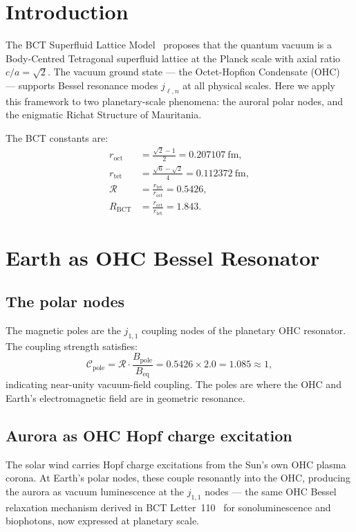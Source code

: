 \documentclass[12pt,twocolumn]{article}
\begin{document}
\section{Introduction}

The BCT Superfluid Lattice Model~\cite{BCT_GoE} proposes that
the quantum vacuum is a Body-Centred Tetragonal superfluid
lattice at the Planck scale with axial ratio $c/a=\sqrt{2}$.
The vacuum ground state --- the Octet-Hopfion Condensate
(OHC)~\cite{BCT_AppJH} --- supports Bessel resonance modes
$j_{\ell,n}$ at all physical scales. Here we apply this
framework to two planetary-scale phenomena: the auroral polar
nodes, and the enigmatic Richat Structure of Mauritania.

The BCT constants are:
\begin{align}
r_\mathrm{oct}&=\frac{\sqrt{2}-1}{2}=0.207107~\mathrm{fm},\\
r_\mathrm{tet}&=\frac{\sqrt{6}-\sqrt{2}}{4}=0.112372~\mathrm{fm},\\
\mathcal{R}&=\frac{r_\mathrm{tet}}{r_\mathrm{oct}}=0.5426,\\
R_\mathrm{BCT}&=\frac{r_\mathrm{oct}}{r_\mathrm{tet}}=1.843.
\end{align}

\section{Earth as OHC Bessel Resonator}

\subsection{The polar nodes}

The magnetic poles are the $j_{1,1}$ coupling nodes of the
planetary OHC resonator. The coupling strength satisfies:
\begin{equation}
\mathcal{C}_\mathrm{pole}=\mathcal{R}\cdot
\frac{B_\mathrm{pole}}{B_\mathrm{eq}}
=0.5426\times2.0=1.085\approx1,
\end{equation}
indicating near-unity vacuum-field coupling. The poles are where
the OHC and Earth's electromagnetic field are in geometric
resonance.

\subsection{Aurora as OHC Hopf charge excitation}

The solar wind carries Hopf charge excitations from the Sun's
own OHC plasma corona. At Earth's polar nodes, these couple
resonantly into the OHC, producing the aurora as vacuum
luminescence at the $j_{1,1}$ nodes --- the same OHC Bessel
relaxation mechanism derived in BCT Letter~110~\cite{BCT_L110}
for sonoluminescence and biophotons, now expressed at
planetary scale.
\end{document}
